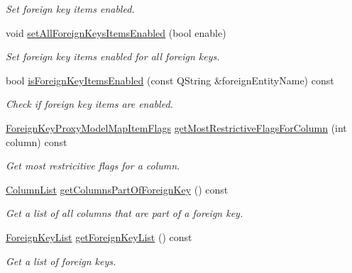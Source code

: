 \begin{DoxyCompactItemize}
\begin{DoxyCompactList}\small\item\em Set foreign key items enabled. \end{DoxyCompactList}\item 
void \hyperlink{class_mdt_1_1_item_model_1_1_foreign_key_proxy_model_map_aa551f338a946cbb2268643ba4f2140dc}{set\+All\+Foreign\+Keys\+Items\+Enabled} (bool enable)
\begin{DoxyCompactList}\small\item\em Set foreign key items enabled for all foreign keys. \end{DoxyCompactList}\item 
bool \hyperlink{class_mdt_1_1_item_model_1_1_foreign_key_proxy_model_map_a295911d09e817851b33b21209f573fff}{is\+Foreign\+Key\+Items\+Enabled} (const Q\+String \&foreign\+Entity\+Name) const 
\begin{DoxyCompactList}\small\item\em Check if foreign key items are enabled. \end{DoxyCompactList}\item 
\hyperlink{class_mdt_1_1_item_model_1_1_foreign_key_proxy_model_map_item_flags}{Foreign\+Key\+Proxy\+Model\+Map\+Item\+Flags} \hyperlink{class_mdt_1_1_item_model_1_1_foreign_key_proxy_model_map_ae7f1203033e44bc15834f8de8998483a}{get\+Most\+Restrictive\+Flags\+For\+Column} (int column) const 
\begin{DoxyCompactList}\small\item\em Get most restricitive flags for a column. \end{DoxyCompactList}\item 
\hyperlink{class_mdt_1_1_item_model_1_1_column_list}{Column\+List} \hyperlink{class_mdt_1_1_item_model_1_1_foreign_key_proxy_model_map_aa966ed79640b10d9b5bfe12f1f778426}{get\+Columns\+Part\+Of\+Foreign\+Key} () const \hypertarget{class_mdt_1_1_item_model_1_1_foreign_key_proxy_model_map_aa966ed79640b10d9b5bfe12f1f778426}{}\label{class_mdt_1_1_item_model_1_1_foreign_key_proxy_model_map_aa966ed79640b10d9b5bfe12f1f778426}

\begin{DoxyCompactList}\small\item\em Get a list of all columns that are part of a foreign key. \end{DoxyCompactList}\item 
\hyperlink{class_mdt_1_1_item_model_1_1_foreign_key_list}{Foreign\+Key\+List} \hyperlink{class_mdt_1_1_item_model_1_1_foreign_key_proxy_model_map_a7f46b5ad35e8b35de94dd0cd938073a6}{get\+Foreign\+Key\+List} () const \hypertarget{class_mdt_1_1_item_model_1_1_foreign_key_proxy_model_map_a7f46b5ad35e8b35de94dd0cd938073a6}{}\label{class_mdt_1_1_item_model_1_1_foreign_key_proxy_model_map_a7f46b5ad35e8b35de94dd0cd938073a6}

\begin{DoxyCompactList}\small\item\em Get a list of foreign keys. \end{DoxyCompactList}\end{DoxyCompactItemize}


